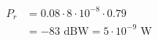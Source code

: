 \documentclass[preview]{standalone}
\begin{document}
\begin{align*}
P_r &= 0.08 \cdot 8 \cdot 10^{-8} \cdot 0.79\\ &= -83 \text{ dBW} = 5 \cdot 10^{-9} \text{ W}
\end{align*}
\end{document}
